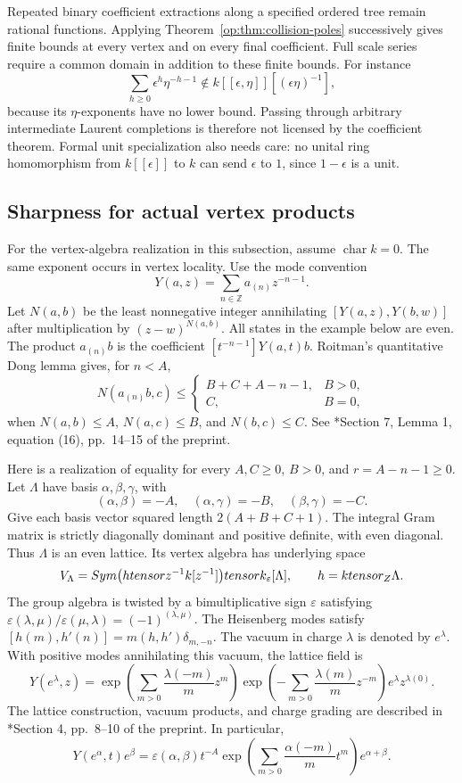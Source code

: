 Repeated binary coefficient extractions along a specified ordered
tree remain rational functions.  Applying
Theorem~\ref{op:thm:collision-poles} successively gives finite bounds
at every vertex and on every final coefficient.  Full scale series
require a common domain in addition to these finite bounds.
For instance
\[
 \sum_{h\ge0}\epsilon^h\eta^{-h-1}
 \notin k[[\epsilon,\eta]][(\epsilon\eta)^{-1}],
\]
because its \(\eta\)-exponents have no lower bound.  Passing through
arbitrary intermediate Laurent completions is therefore not licensed
by the coefficient theorem.  Formal unit specialization also needs
care: no unital ring homomorphism from \(k[[\epsilon]]\) to \(k\)
can send \(\epsilon\) to \(1\), since \(1-\epsilon\) is a unit.

\subsection{Sharpness for actual vertex products}

For the vertex-algebra realization in this subsection, assume
\(\operatorname{char}k=0\).
The same exponent occurs in vertex locality.  Use the mode convention
\[
 Y(a,z)=\sum_{n\in\mathbb Z}a_{(n)}z^{-n-1}.
\]
Let \(N(a,b)\) be the least nonnegative integer annihilating
\([Y(a,z),Y(b,w)]\) after multiplication by \((z-w)^{N(a,b)}\).
All states in the example below are even.  The product \(a_{(n)}b\)
is the coefficient \([t^{-n-1}]Y(a,t)b\).  Roitman's quantitative
Dong lemma gives, for \(n<A\),
\[
 N(a_{(n)}b,c)\le
 \begin{cases}
 B+C+A-n-1,&B>0,\\
 C,&B=0,
 \end{cases}
\]
when \(N(a,b)\le A\), \(N(a,c)\le B\), and
\(N(b,c)\le C\).  See \cite{Roi02}*{Section 7, Lemma 1,
equation (16), pp.\ 14--15 of the preprint}.

Here is a realization of equality for every
\(A,C\ge0\), \(B>0\), and \(r=A-n-1\ge0\).
Let \(\Lambda\) have basis \(\alpha,\beta,\gamma\), with
\[
 (\alpha,\beta)=-A,\quad (\alpha,\gamma)=-B,\quad
 (\beta,\gamma)=-C.
\]
Give each basis vector squared length \(2(A+B+C+1)\).
The integral Gram matrix is strictly diagonally dominant and positive
definite, with even diagonal.  Thus \(\Lambda\) is an even lattice.
Its vertex algebra has underlying space
\[
 V_\Lambda=
 Sym\bigl(htensor z^{-1}k[z^{-1}]\bigr)
 tensor k_\varepsilon[\Lambda],\qquad
 h=ktensor_{Z}\Lambda.
\]
The group algebra is twisted by a bimultiplicative sign
\(\varepsilon\) satisfying
\(\varepsilon(\lambda,\mu)/\varepsilon(\mu,\lambda)
=(-1)^{(\lambda,\mu)}\).
The Heisenberg modes satisfy
\([h(m),h'(n)]=m(h,h')\delta_{m,-n}\).
The vacuum in charge \(\lambda\) is denoted by \(e^\lambda\).
With positive modes annihilating this vacuum, the lattice field is
\[
 Y(e^\lambda,z)=
 \exp\left(\sum_{m>0}\frac{\lambda(-m)}m z^m\right)
 \exp\left(-\sum_{m>0}\frac{\lambda(m)}m z^{-m}\right)
 e^\lambda z^{\lambda(0)}.
\]
The lattice construction, vacuum products, and charge grading are
described in \cite{Roi02}*{Section 4, pp.\ 8--10 of the preprint}.
In particular,
\[
 Y(e^\alpha,t)e^\beta
 =\varepsilon(\alpha,\beta)t^{-A}
 \exp\left(\sum_{m>0}\frac{\alpha(-m)}m t^m\right)
 e^{\alpha+\beta}.
\]


